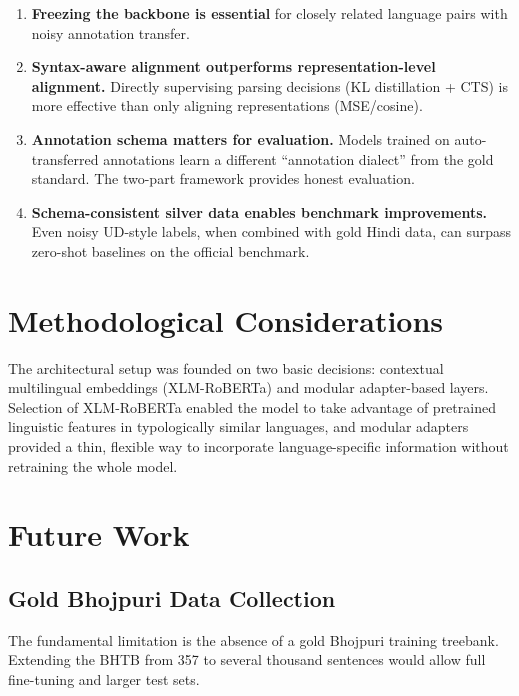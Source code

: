 \documentclass[12pt,a4paper,oneside]{report}
\newcommand{\xlmr}{XLM-RoBERTa}
\begin{document}
\begin{enumerate}
  \item \textbf{Freezing the backbone is essential} for closely related language pairs
        with noisy annotation transfer.

  \item \textbf{Syntax-aware alignment outperforms representation-level alignment.}
        Directly supervising parsing decisions (KL distillation + CTS) is more
        effective than only aligning representations (MSE/cosine).

  \item \textbf{Annotation schema matters for evaluation.} Models trained on
        auto-transferred annotations learn a different ``annotation dialect'' from the
        gold standard. The two-part framework provides honest evaluation.

  \item \textbf{Schema-consistent silver data enables benchmark improvements.}
        Even noisy UD-style labels, when combined with gold Hindi data, can surpass
        zero-shot baselines on the official benchmark.
\end{enumerate}

\section{Methodological Considerations}

The architectural setup was founded on two basic decisions: contextual multilingual
embeddings (\xlmr{}) and modular adapter-based layers. Selection of \xlmr{} enabled
the model to take advantage of pretrained linguistic features in typologically similar
languages, and modular adapters provided a thin, flexible way to incorporate
language-specific information without retraining the whole model.

\section{Future Work}

\subsection{Gold Bhojpuri Data Collection}

The fundamental limitation is the absence of a gold Bhojpuri training treebank.
Extending the BHTB from 357 to several thousand sentences would allow full
fine-tuning and larger test sets.
\end{document}
